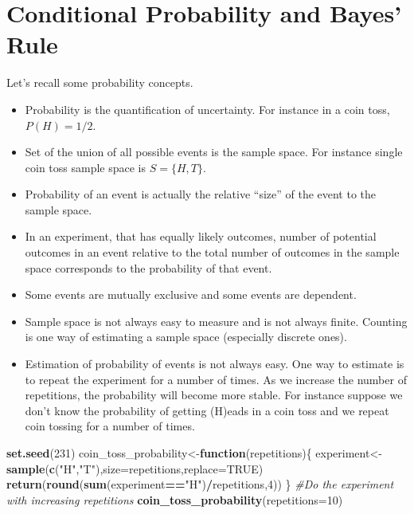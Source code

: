 \documentclass[]{book}
\newenvironment{Shaded}{\begin{snugshade}}{\end{snugshade}}
\newcommand{\CommentTok}[1]{\textcolor[rgb]{0.56,0.35,0.01}{\textit{#1}}}
\newcommand{\ControlFlowTok}[1]{\textcolor[rgb]{0.13,0.29,0.53}{\textbf{#1}}}
\newcommand{\DataTypeTok}[1]{\textcolor[rgb]{0.13,0.29,0.53}{#1}}
\newcommand{\DecValTok}[1]{\textcolor[rgb]{0.00,0.00,0.81}{#1}}
\newcommand{\KeywordTok}[1]{\textcolor[rgb]{0.13,0.29,0.53}{\textbf{#1}}}
\newcommand{\NormalTok}[1]{#1}
\newcommand{\OperatorTok}[1]{\textcolor[rgb]{0.81,0.36,0.00}{\textbf{#1}}}
\newcommand{\OtherTok}[1]{\textcolor[rgb]{0.56,0.35,0.01}{#1}}
\newcommand{\StringTok}[1]{\textcolor[rgb]{0.31,0.60,0.02}{#1}}
\providecommand{\tightlist}{%
  \setlength{\itemsep}{0pt}\setlength{\parskip}{0pt}}
\theoremstyle{definition}
\theoremstyle{definition}
\theoremstyle{definition}
\theoremstyle{remark}
\begin{document}
\hypertarget{cond}{%
\chapter{Conditional Probability and Bayes' Rule}\label{cond}}

Let's recall some probability concepts.

\begin{itemize}
\tightlist
\item
  Probability is the quantification of uncertainty. For instance in a
  coin toss, \(P(H) = 1/2\).
\item
  Set of the union of all possible events is the sample space. For
  instance single coin toss sample space is \(S = \{H,T\}\).
\item
  Probability of an event is actually the relative ``size'' of the event
  to the sample space.
\item
  In an experiment, that has equally likely outcomes, number of
  potential outcomes in an event relative to the total number of
  outcomes in the sample space corresponds to the probability of that
  event.
\item
  Some events are mutually exclusive and some events are dependent.
\item
  Sample space is not always easy to measure and is not always finite.
  Counting is one way of estimating a sample space (especially discrete
  ones).
\item
  Estimation of probability of events is not always easy. One way to
  estimate is to repeat the experiment for a number of times. As we
  increase the number of repetitions, the probability will become more
  stable. For instance suppose we don't know the probability of getting
  (H)eads in a coin toss and we repeat coin tossing for a number of
  times.
\end{itemize}

\begin{Shaded}
\begin{Highlighting}[]
\KeywordTok{set.seed}\NormalTok{(}\DecValTok{231}\NormalTok{)}
\NormalTok{coin_toss_probability<-}\ControlFlowTok{function}\NormalTok{(repetitions)\{}
\NormalTok{    experiment<-}\KeywordTok{sample}\NormalTok{(}\KeywordTok{c}\NormalTok{(}\StringTok{"H"}\NormalTok{,}\StringTok{"T"}\NormalTok{),}\DataTypeTok{size=}\NormalTok{repetitions,}\DataTypeTok{replace=}\OtherTok{TRUE}\NormalTok{)}
    \KeywordTok{return}\NormalTok{(}\KeywordTok{round}\NormalTok{(}\KeywordTok{sum}\NormalTok{(experiment}\OperatorTok{==}\StringTok{"H"}\NormalTok{)}\OperatorTok{/}\NormalTok{repetitions,}\DecValTok{4}\NormalTok{))}
\NormalTok{\}}
\CommentTok{#Do the experiment with increasing repetitions}
\KeywordTok{coin_toss_probability}\NormalTok{(}\DataTypeTok{repetitions=}\DecValTok{10}\NormalTok{)}
\end{Highlighting}
\end{Shaded}
\end{document}
